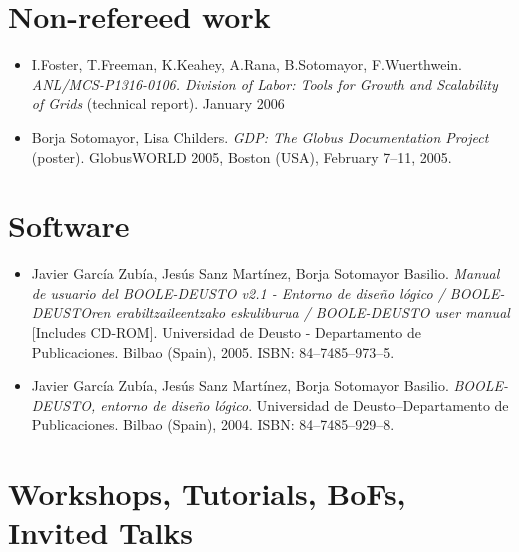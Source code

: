\documentclass[11pt,letterpaper,sans]{moderncv}
\begin{document}
\section{Non-refereed work}

\begin{itemize}
\item I.Foster, T.Freeman, K.Keahey, A.Rana, B.Sotomayor, F.Wuerthwein. \emph{ANL/MCS-P1316-0106. Division of Labor: Tools for Growth and Scalability of Grids} (technical report). January 2006
\item Borja Sotomayor, Lisa Childers. \emph{GDP: The Globus Documentation Project} (poster). GlobusWORLD 2005, Boston (USA), February 7--11, 2005.
\end{itemize}

\section{Software}

\begin{itemize}
\item Javier Garc\'ia Zub\'ia, Jes\'us Sanz Mart\'inez, Borja Sotomayor Basilio. \emph{Manual de usuario del BOOLE-DEUSTO v2.1 - Entorno de dise\~no l\'ogico / BOOLE-DEUSTOren erabiltzaileentzako eskuliburua / BOOLE-DEUSTO user manual} [Includes CD-ROM]. Universidad de Deusto - Departamento de Publicaciones. Bilbao (Spain), 2005. ISBN: 84--7485--973--5.
\item Javier Garc\'ia Zub\'ia, Jes\'us Sanz Mart\'inez, Borja Sotomayor Basilio. \emph{BOOLE-DEUSTO, entorno de dise\~no l\'ogico}. Universidad de Deusto--Departamento de Publicaciones. Bilbao (Spain), 2004. ISBN: 84--7485--929--8.
\end{itemize}

\newpage
\section{Workshops, Tutorials, BoFs, Invited Talks}
\end{document}
